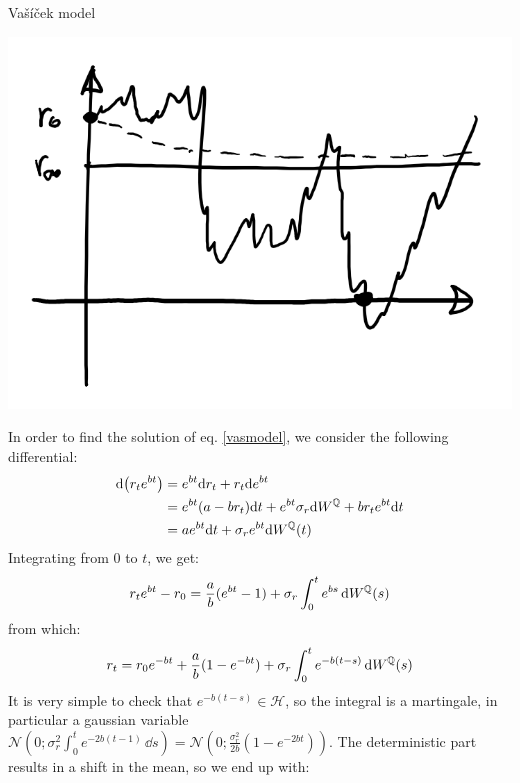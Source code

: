 \begin{example}{Vašíček model}{}{}
    \begin{center}\label{fig:vasicek}
        \includegraphics[scale=0.3]{fig/tmp/fig30.png}
    \end{center}
    In order to find the solution of eq. \eqref{vasmodel}, we consider the following differential:
    \begin{align}
        \notag \dd(r_te^{bt}) &= e^{bt}\dd r_t + r_t\dd e^{bt} \\
        &=
        \notag e^{bt}(a-br_t)\dd t + e^{bt}\sigma_r \dd W^{\mathbb{Q}} + br_te^{bt}\dd t \\
        &=
        ae^{bt}\dd t + \sigma_r e^{bt} \dd W^{\mathbb{Q}}(t)
    \end{align}
    Integrating from 0 to $t$, we get:
    \begin{align}
        r_t e^{bt} - r_0 = \frac{a}{b}(e^{bt}-1) + \sigma_r \int_0^t e^{bs}\,\dd W^{\mathbb{Q}}(s)
    \end{align}
    from which:
    \begin{equation}
        r_t = r_0e^{-bt} + \frac{a}{b}(1-e^{-bt}) + \sigma_r \int_0^t e^{-b(t-s)}\,\dd W^{\mathbb{Q}}(s)
    \end{equation}
    It is very simple to check that $e^{-b(t-s)}\in\mathcal{H}$, so the integral is a martingale, in particular a gaussian variable $\mathcal{N}\left(0;\sigma_r^2\int_0^te^{-2b(t-1)}\,\dd s\right) = \mathcal{N}\left(0;\frac{\sigma^2_r}{2b}\left(1-e^{-2bt}\right)\right)$. The deterministic part results in a shift in the mean, so we end up with:
    \begin{equation}

\end{equation}
\end{example}
